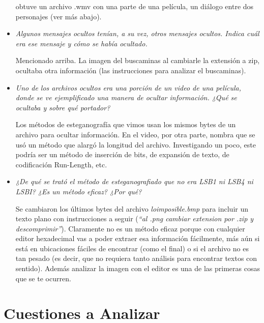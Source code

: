 \documentclass[a4paper,12pt]{article}
\begin{document}
\begin{itemize}
		
		obtuve un archivo .wmv con una parte de una película, un diálogo entre dos personajes (ver más abajo).
		
		\newpage
		
		\item \textit{Algunos mensajes ocultos tenían, a su vez, otros mensajes ocultos. Indica cuál era ese mensaje y cómo se había ocultado.}

		Mencionado arriba. La imagen del buscaminas al cambiarle la extensión a zip, ocultaba otra información (las instrucciones para analizar el buscaminas).

		\item \textit{Uno de los archivos ocultos era una porción de un video de una película, donde se ve ejemplificado una manera de ocultar información. ¿Qué se ocultaba y sobre qué portador?}

		Los métodos de esteganografía que vimos usan los mismos bytes de un archivo para ocultar información. En el video, por otra parte, nombra que se usó un método que alargó la longitud del archivo. Investigando un poco, este podría ser un método de inserción de bits, de expansión de texto, de codificación Run-Length, etc.
		
		\item \textit{¿De qué se trató el método de esteganografiado que no era LSB1 ni LSB4 ni LSBI? ¿Es un método eficaz? ¿Por qué?}
		
		Se cambiaron los últimos bytes del archivo \textit{loimposible.bmp} para incluir un texto plano con instrucciones a seguir (\textit{``al .png cambiar extension por .zip y descomprimir''}). Claramente no es un método eficaz porque con cualquier editor hexadecimal vas a poder extraer esa información fácilmente, más aún si está en ubicaciones fáciles de encontrar (como el final) o si el archivo no es tan pesado (es decir, que no requiera tanto análisis para encontrar textos con sentido). Además analizar la imagen con el editor es una de las primeras cosas que se te ocurren.
	
	\end{itemize}
	
	\newpage
	
	\section{Cuestiones a Analizar}
	
\end{document}
